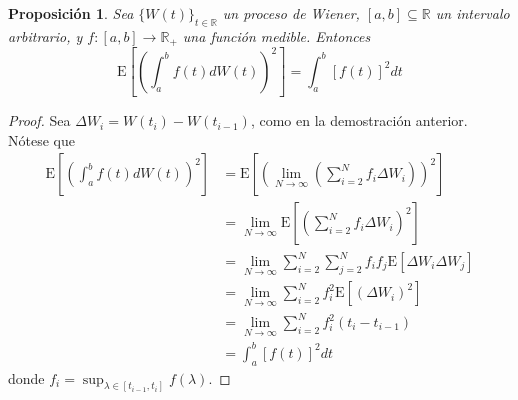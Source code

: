 \documentclass[12pt,letterpaper]{book}
\newtheorem{proposicion}[teorema]{Proposición}
\newcommand{\R}{\mathbb{R}}
\newcommand{\E}[1]{\mathrm{E}\left[ #1 \right]}
\begin{document}
\begin{proposicion}
\label{prop:lazy100}
Sea $\{ W(t)\}_{t\in\R}$ un proceso de Wiener, $[a,b]\subseteq\R$ un intervalo arbitrario, y $f:[a,b]\longrightarrow\R_+$ una función medible. Entonces
\begin{equation}
\E{\left(\int_a^b f(t) dW(t) \right)^2 } = \int_a^b \left[ f(t) \right]^2 dt
\end{equation}
\end{proposicion}
\begin{proof}
Sea $\Delta W_i = W(t_i) - W(t_{i-1})$, como en la demostración anterior.
Nótese que
\begin{align*}
\E{\left(\int_a^b f(t) dW(t) \right)^2 } &=
\E{\left( \lim_{N\rightarrow \infty} \left(
\sum_{i=2}^N f_i \Delta W_i \right) \right)^2} \\
&= 
\lim_{N\rightarrow \infty} \E{ \left(
\sum_{i=2}^N f_i \Delta W_i \right)^2} \\
&=
\lim_{N\rightarrow \infty} \sum_{i=2}^N \sum_{j=2}^N
f_i f_j \E{  \Delta W_i \Delta W_j } \\
&=
\lim_{N\rightarrow \infty} \sum_{i=2}^N
f_i^2 \E{  \left( \Delta W_i \right)^2 } \\
&=
\lim_{N\rightarrow \infty} \sum_{i=2}^N
f_i^2 (t_i-t_{i-1}) \\
&=
\int_a^b \left[ f(t) \right]^2 dt
\end{align*}
donde $f_i = \sup_{\lambda \in [t_{i-1},t_i]} f(\lambda)$.
\end{proof}
\end{document}
